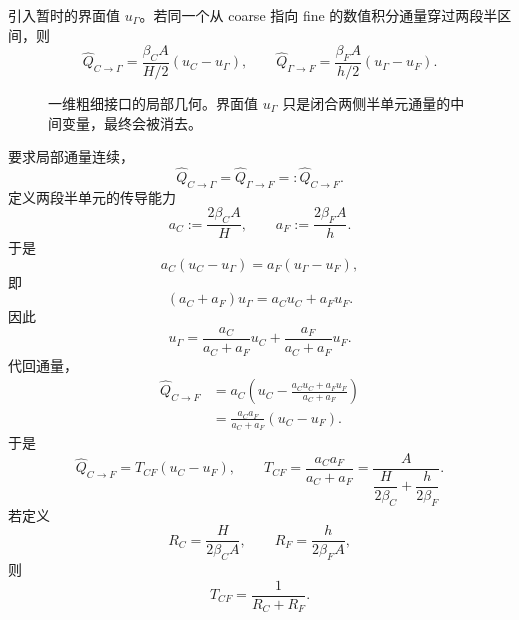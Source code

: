引入暂时的界面值 $u_\Gamma$。若同一个从 coarse 指向 fine 的数值积分通量穿过两段半区间，则
\begin{equation}
\widehat Q_{C\rightarrow\Gamma}
=
\frac{\beta_CA}{H/2}(u_C-u_\Gamma),
\qquad
\widehat Q_{\Gamma\rightarrow F}
=
\frac{\beta_FA}{h/2}(u_\Gamma-u_F).
\end{equation}
\begin{figure}[htbp]
\centering
{}
\caption{一维粗细接口的局部几何。界面值 $u_\Gamma$ 只是闭合两侧半单元通量的中间变量，最终会被消去。}
\label{fig:amr-interface-elimination}
\end{figure}

要求局部通量连续，
\begin{equation}
\widehat Q_{C\rightarrow\Gamma}
=
\widehat Q_{\Gamma\rightarrow F}
=:\widehat Q_{C\rightarrow F}.
\end{equation}
定义两段半单元的传导能力
\begin{equation}
a_C:=\frac{2\beta_CA}{H},
\qquad
a_F:=\frac{2\beta_FA}{h}.
\label{eq:amr-half-cell-conductances}
\end{equation}
于是
\begin{equation}
a_C(u_C-u_\Gamma)
=
a_F(u_\Gamma-u_F),
\end{equation}
即
\begin{equation}
(a_C+a_F)u_\Gamma
=
a_Cu_C+a_Fu_F.
\end{equation}
因此
\begin{equation}
\boxed{
u_\Gamma
=
\frac{a_C}{a_C+a_F}u_C
+
\frac{a_F}{a_C+a_F}u_F.
}
\label{eq:amr-interface-state-elimination}
\end{equation}
代回通量，
\begin{align}
\widehat Q_{C\rightarrow F}
&=
a_C\left(
u_C-
\frac{a_Cu_C+a_Fu_F}{a_C+a_F}
\right)\\
&=
\frac{a_Ca_F}{a_C+a_F}(u_C-u_F).
\end{align}
于是
\begin{equation}
\boxed{
\widehat Q_{C\rightarrow F}
=T_{CF}(u_C-u_F),
\qquad
T_{CF}
=
\frac{a_Ca_F}{a_C+a_F}
=
\frac{A}{\dfrac{H}{2\beta_C}+\dfrac{h}{2\beta_F}}.
}
\label{eq:amr_cf_transmissibility}
\end{equation}
若定义
\begin{equation}
R_C=\frac{H}{2\beta_CA},
\qquad
R_F=\frac{h}{2\beta_FA},
\end{equation}
则
\begin{equation}
\boxed{
T_{CF}
=
\frac{1}{R_C+R_F}.
}
\label{eq:amr-interface-series-resistance}
\end{equation}

